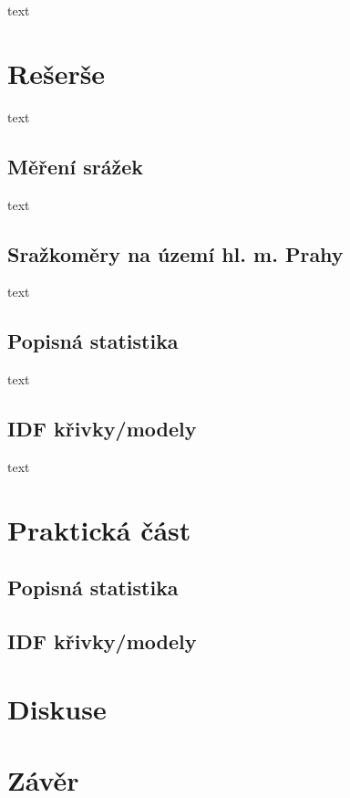 \documentclass[12pt,a4paper]{report}
\begin{document}
text

\section{Rešerše}

text

\subsection{Měření srážek}

text

\subsection{Sražkoměry na území hl. m. Prahy}

text

\subsection{Popisná statistika}

text

\subsection{IDF křivky/modely}

text

\section{Praktická část}

\subsection{Popisná statistika}

\subsection{IDF křivky/modely}

\section{Diskuse}

\section{Závěr}
\end{document}

